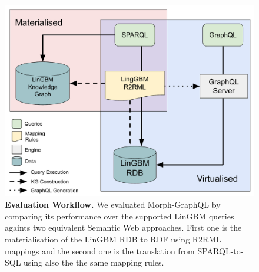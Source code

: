 \begin{figure}[t]
    \centering
    \includegraphics[width=.8\linewidth]{figures/evaluation.pdf}
    \caption[Morph-GraphQL evaluation workflow.]{\textbf{Evaluation Workflow.} We evaluated Morph-GraphQL by comparing its performance over the supported LinGBM queries againts two equivalent Semantic Web approaches. First one is the materialisation of the LinGBM RDB to RDF using R2RML mappings and the second one is the translation from SPARQL-to-SQL using also the the same mapping rules.}
    \label{fig:eval-workflow}
\end{figure}

